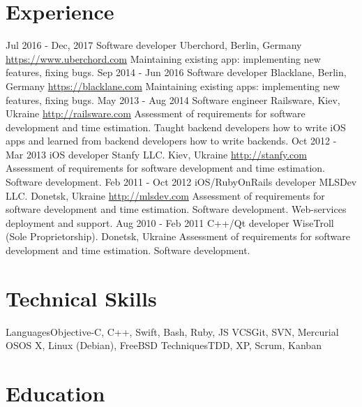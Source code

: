 \documentclass[11pt,a4paper]{moderncv}
\begin{document}
\section{Experience}
\cventry
  {Jul 2016 - Dec, 2017}
  {Software developer}
  {Uberchord, Berlin, Germany}
  {\newline{}\url{https://www.uberchord.com}}{}
  {Maintaining existing app: implementing new features, fixing bugs.}
\cventry
  {Sep 2014 - Jun 2016}
  {Software developer}
  {Blacklane, Berlin, Germany}
  {\newline{}\url{https://blacklane.com}}{}
  {Maintaining existing apps: implementing new features, fixing bugs.}
\cventry
  {May 2013 - Aug 2014}
  {Software engineer}
  {Railsware, Kiev, Ukraine}
  {\newline{}\url{http://railsware.com}}{}
  {Assessment of requirements for software development and time estimation.\newline{}
  Taught backend developers how to write iOS apps and learned from backend developers how to write backends.}
\cventry
  {Oct 2012 - Mar 2013}
  {iOS developer}
  {Stanfy LLC. Kiev, Ukraine}
  {\newline{}\url{http://stanfy.com}}{}
  {Assessment of requirements for software development and time estimation.
  \newline{}Software development.}
\cventry
  {Feb 2011 - Oct 2012}
  {iOS/RubyOnRails developer}
  {MLSDev LLC. Donetsk, Ukraine}
  {\newline{}\url{http://mlsdev.com}}{}
  {Assessment of requirements for software development and time estimation.\newline{}
  Software development. Web-services deployment and support.}
\cventry
  {Aug 2010 - Feb 2011}
  {C++/Qt developer}
  {WiseTroll (Sole Proprietorship). Donetsk, Ukraine}
  {}{}
  {Assessment of requirements for software development and time estimation.
  \newline{}Software development.}

\section{Technical Skills}
\cvline
  {Languages}{Objective-C, C++, Swift, Bash, Ruby, JS}
\cvline
  {VCS}{Git, SVN, Mercurial}
\cvline
  {OS}{OS X, Linux (Debian), FreeBSD}
\cvline
  {Techniques}{TDD, XP, Scrum, Kanban}

\section{Education}
\end{document}
